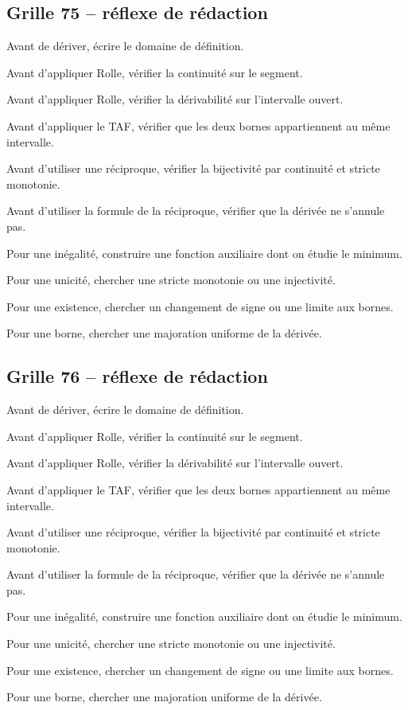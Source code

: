 \documentclass[11pt,a4paper]{article}
\begin{document}
\subsection*{Grille 75 -- réflexe de rédaction}

\begin{methodebox}

Avant de dériver, écrire le domaine de définition.

Avant d'appliquer Rolle, vérifier la continuité sur le segment.

Avant d'appliquer Rolle, vérifier la dérivabilité sur l'intervalle ouvert.

Avant d'appliquer le TAF, vérifier que les deux bornes appartiennent au même intervalle.

Avant d'utiliser une réciproque, vérifier la bijectivité par continuité et stricte monotonie.

Avant d'utiliser la formule de la réciproque, vérifier que la dérivée ne s'annule pas.

Pour une inégalité, construire une fonction auxiliaire dont on étudie le minimum.

Pour une unicité, chercher une stricte monotonie ou une injectivité.

Pour une existence, chercher un changement de signe ou une limite aux bornes.

Pour une borne, chercher une majoration uniforme de la dérivée.

\end{methodebox}

\subsection*{Grille 76 -- réflexe de rédaction}

\begin{methodebox}

Avant de dériver, écrire le domaine de définition.

Avant d'appliquer Rolle, vérifier la continuité sur le segment.

Avant d'appliquer Rolle, vérifier la dérivabilité sur l'intervalle ouvert.

Avant d'appliquer le TAF, vérifier que les deux bornes appartiennent au même intervalle.

Avant d'utiliser une réciproque, vérifier la bijectivité par continuité et stricte monotonie.

Avant d'utiliser la formule de la réciproque, vérifier que la dérivée ne s'annule pas.

Pour une inégalité, construire une fonction auxiliaire dont on étudie le minimum.

Pour une unicité, chercher une stricte monotonie ou une injectivité.

Pour une existence, chercher un changement de signe ou une limite aux bornes.

Pour une borne, chercher une majoration uniforme de la dérivée.

\end{methodebox}
\end{document}

